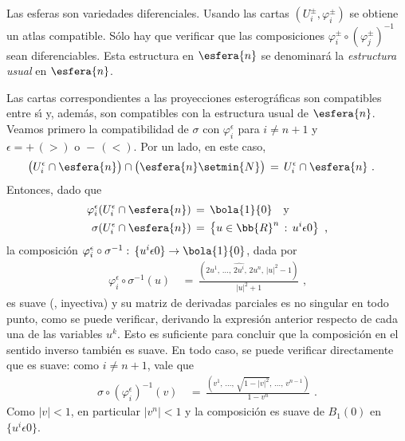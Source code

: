 \begin{ejemplo}
	Las esferas son variedades diferenciales. Usando las cartas
	$(U_{i}^{\pm},\varphi_{i}^{\pm})$ se obtiene un atlas compatible.
	S\'{o}lo hay que verificar que las composiciones
	$\varphi_{i}^{\pm}\circ(\varphi_{j}^{\pm})^{-1}$ sean diferenciables.
	Esta estructura en $\esfera{n}$ se denominar\'{a} la
	\emph{estructura usual} en $\esfera{n}$.

	Las cartas correspondientes a las proyecciones esterogr\'{a}ficas
	son compatibles entre s\'{\i} y, adem\'{a}s, son compatibles
	con la estructura usual de $\esfera{n}$. Veamos primero la
	compatibilidad de $\sigma$ con $\varphi_{i}^{\epsilon}$
	para $i\not =n+1$ y $\epsilon=+\,(>)\text{ o }-\,(<)$. Por un lado,
	en este	caso,
	\begin{align*}
		\big(U_{i}^{\epsilon}\cap\esfera{n}\big)\cap
			\big(\esfera{n}\setmin\{N\}\big) & \,=\,
			U_{i}^{\epsilon}\cap\esfera{n}
		\text{ .}
	\end{align*}
	Entonces, dado que
	\begin{align*}
		\varphi_{i}^{\epsilon}(U_{i}^{\epsilon}\cap\esfera{n}) &
			\,=\,\bola{1}{0}\quad\text{y} \\
		\sigma(U_{i}^{\epsilon}\cap\esfera{n}) & \,=\,
			\left\lbrace u\in\bb{R}^{n}\,:\,u^{i}\epsilon 0
				\right\rbrace
		\text{ ,}
	\end{align*}
	la composici\'{o}n $\varphi_{i}^{\epsilon}\circ\sigma^{-1}:\,%
	\{u^{i}\epsilon 0\}\rightarrow\bola{1}{0}$, dada por
	\begin{align*}
		\varphi_{i}^{\epsilon}\circ\sigma^{-1}(u) & \,=\,
			\frac{(2u^{1},\,\dots,\,\widehat{2u^{i}},\,2u^{n},\,%
				|u|^{2}-1)}{|u|^{2}+1}
		\text{ ,}
	\end{align*}
	es suave (, inyectiva) y su matriz de derivadas parciales es
	no singular en todo punto, como se puede verificar, derivando la
	expresi\'{o}n anterior respecto de cada una de las variables
	$u^{k}$. Esto es suficiente para concluir que la composici\'{o}n
	en el sentido inverso tambi\'{e}n es suave. En todo caso, se
	puede verificar directamente que es suave: como $i\not =n+1$,
	vale que
	\begin{align*}
		\sigma\circ(\varphi_{i}^{\epsilon})^{-1}(v) & \,=\,
			\frac{(v^{1},\,\dots,\,\sqrt{1-|v|^{2}},%
				\,\dots,\,v^{n-1})}{1-v^{n}}
		\text{ .}
	\end{align*}
	Como $|v|<1$, en particular $|v^{n}|<1$ y la composici\'{o}n es
	suave de $B_{1}(0)$ en $\{u^{i}\epsilon 0\}$.


\end{ejemplo}
